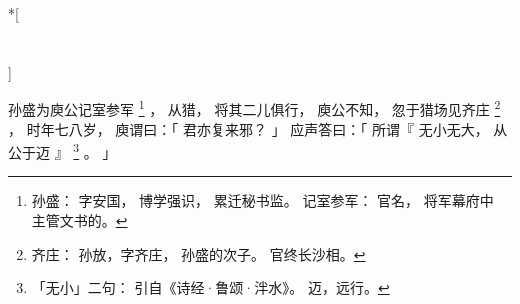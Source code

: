 
\switchcolumn[0]*[\section{}]

孙盛为庾公记室参军%
\footnote{%
    孙盛：
        字安国，
        博学强识，
        累迁秘书监。
    记室参军：
        官名，
        将军幕府中
        主管文书的。
}%
，
从猎，
将其二儿俱行，
庾公不知，
忽于猎场见齐庄%
\footnote{%
    齐庄：
        孙放，字齐庄，
        孙盛的次子。
        官终长沙相。
}%
，
时年七八岁，
庾谓曰：「
    君亦复来邪？
」
应声答曰：「
    所谓『
        无小无大，
        从公于迈
    』%
    \footnote{%
        「无小」二句：
            引自《诗经·鲁颂·泮水》。
            迈，远行。
    }%
    。
」

\switchcolumn


